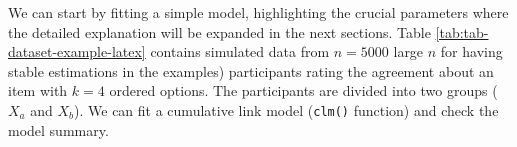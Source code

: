 \documentclass[
  man,floatsintext]{apa6}
\begin{document}
We can start by fitting a simple model, highlighting the crucial parameters where the detailed explanation will be expanded in the next sections. Table \ref{tab:tab-dataset-example-latex} contains simulated data from \(n = 5000\) large \(n\) for having stable estimations in the examples) participants rating the agreement about an item with \(k = 4\) ordered options. The participants are divided into two groups (\(X_a\) and \(X_b\)). We can fit a cumulative link model (\texttt{clm()} function) and check the model summary.

\scriptsize

\normalsize

\scriptsize

\begin{table}
\centering
\caption{\label{tab:tab-dataset-example-latex}Summary of the simulated dataset. For each group (a and b) we reported mean, median and standard deviation of the ordinal outcome (metric descriptive statistics). For each ordinal outcome (\(Y\)) we reported the frequency and (within parentheses) the probability.}
\centering
{}
\end{table}

\normalsize

\scriptsize

\normalsize

\scriptsize
\end{document}

